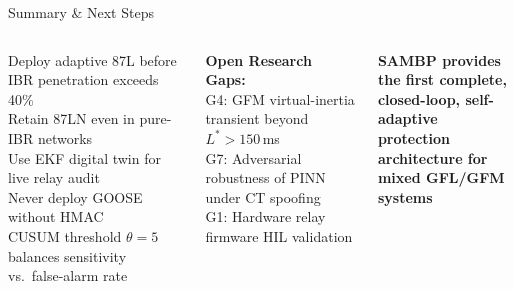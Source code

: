 \documentclass[aspectratio=169, 10pt]{beamer}
\begin{document}
\begin{frame}{Summary \& Next Steps}
\begin{columns}[T]
      \vspace{0.2cm}
      \begin{tcolorbox}[keyfact, title=Recommended Next Steps]
        \scriptsize
        \faCheckSquare\;Deploy adaptive 87L before IBR penetration
             exceeds 40\%\\[3pt]
        \faCheckSquare\;Retain 87LN even in pure-IBR networks\\[3pt]
        \faCheckSquare\;Use EKF digital twin for live relay audit\\[3pt]
        \faCheckSquare\;Never deploy GOOSE without HMAC\\[3pt]
        \faCheckSquare\;CUSUM threshold $\theta{=}5$ balances
             sensitivity vs.\ false-alarm rate
      \end{tcolorbox}
      \vspace{0.25cm}
      \begin{tcolorbox}[alert2]
        \scriptsize\centering
        \textbf{Open Research Gaps:}\\[3pt]
        G4: GFM virtual-inertia transient beyond $L^*{>}150$\,ms\\[2pt]
        G7: Adversarial robustness of PINN under CT spoofing\\[2pt]
        G1: Hardware relay firmware HIL validation
      \end{tcolorbox}
      \vspace{0.25cm}
      \begin{tcolorbox}[result]
        \scriptsize\centering
        \textbf{SAMBP provides the first complete,}\\
        \textbf{closed-loop, self-adaptive protection}\\
        \textbf{architecture for mixed GFL/GFM systems}
      \end{tcolorbox}
  \end{columns}


\end{frame}
\end{document}
